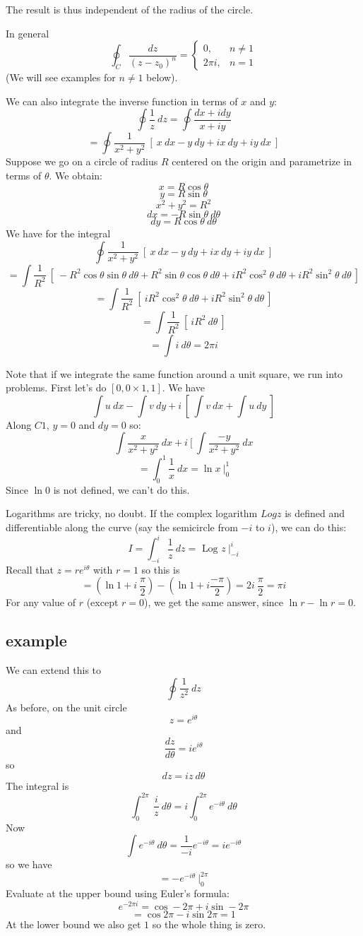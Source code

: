 \documentclass[11pt, oneside]{article}
\begin{document}
The result is thus independent of the radius of the circle.

In general
\[ \oint_C \frac{dz}{(z - z_0)^n} = 
\begin{cases}
0, & n \ne 1 \\
2 \pi i, & n = 1 
\end {cases}
\]
(We will see examples for $n \ne 1$ below).

We can also integrate the inverse function in terms of $x$ and $y$:
\[ \oint \frac{1}{z} \ dz = \oint \frac{dx + i dy}{x + iy} \]
\[ = \oint \frac{1}{x^2+y^2} \ [ \  x \ dx - y \ dy + i x \ dy + i y \ dx \ ] \]
Suppose we go on a circle of radius $R$ centered on the origin and parametrize in terms of $\theta$.  We obtain:
\[ x = R \cos \theta \]
\[ y = R \sin \theta \]
\[ x^2 + y^2 = R^2 \]
\[ dx = - R \sin \theta \ d \theta \]
\[ dy = R \cos \theta \ d \theta \]
We have for the integral
\[ \oint \frac{1}{x^2+y^2} \ [ \  x \ dx - y \ dy + i x \ dy + i y \ dx \ ] \]
\[ = \int \frac{1}{R^2} \ [ \ -R^2 \cos \theta \sin \theta \ d \theta + R^2 \sin \theta \cos \theta \ d \theta + i R^2 \cos^2 \theta \ d \theta + i R^2 \sin^2 \theta \ d \theta \ ] \]
\[ = \int \frac{1}{R^2} \ [ \ i R^2 \cos^2 \theta \ d \theta + i R^2 \sin^2 \theta \ d \theta \ ] \]
\[ = \int \frac{1}{R^2} \ [ \ i R^2 \ d \theta \ ] \]
\[ = \int i \ d \theta = 2 \pi i \]

Note that if we integrate the same function around a unit square, we run into problems.  First let's  do $[0,0 \times 1,1]$.  We have
\[ \int u \ dx - \int v \ dy + i \ [ \ \int v \ dx + \int u \ dy \ ]  \]
Along $C1$, $y = 0$ and $dy = 0$ so:
\[ \int \frac{x}{x^2 + y^2} \ dx + i \ [ \ \int \frac{-y}{x^2 + y^2} \ dx \]
\[ = \int_0^1 \frac{1}{x} \ dx = \ln x \ \bigg |_0^1 \]
Since $\ln 0$ is not defined, we can't do this.

Logarithms are tricky, no doubt.  If the complex logarithm $Log z$ is defined and differentiable along the curve (say the semicircle from $-i$ to $i$), we can do this:
\[ I = \int_{-i}^i \frac{1}{z} \ dz = \text{ Log } z \ \bigg |_{-i}^i  \]
Recall that $z = re^{i\theta}$ with $r=1$ so this is
\[ = (\ln 1 + i \ \frac{\pi}{2} ) - (\ln 1 + i \frac{-\pi}{2} ) = 2i \ \frac{\pi}{2} = \pi i \]
For any value of $r$ (except $r=0$), we get the same answer, since $\ln r - \ln r = 0$.

\subsection*{example}
We can extend this to 
\[ \oint \frac{1}{z^2} \ dz \]
As before, on the unit circle
\[ z = e^{i\theta} \]
and
\[ \frac{dz}{d \theta} = i e^{i \theta} \]
so
\[ dz = i z \ d \theta \]
The integral is
\[ \int_0^{2 \pi} \ \frac{i}{z} \ d \theta =  i \int_0^{2 \pi} e^{-i\theta} \ d \theta \]
Now
\[ \int e^{-i\theta} \ d \theta = \frac{1}{-i} e^{-i\theta} = i e^{-i\theta} \]
so we have
\[ = - e^{-i\theta} \ \bigg |_0^{2 \pi}  \]
Evaluate at the upper bound using Euler's formula:
\[ e^{-2\pi i} = \cos -2 \pi + i \sin -2 \pi \]
\[ = \cos 2 \pi - i \sin 2 \pi = 1 \]
At the lower bound we also get $1$ so the whole thing is zero.
\end{document}
